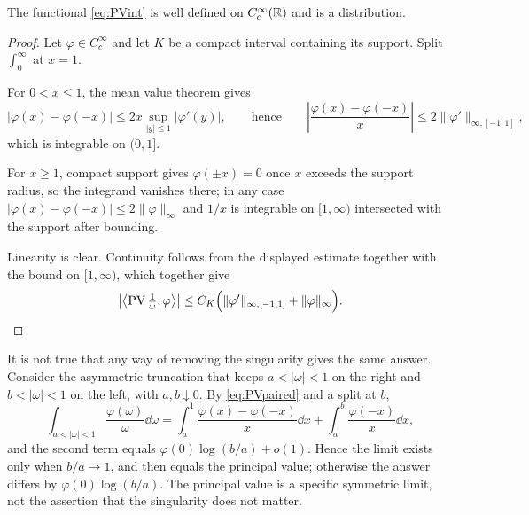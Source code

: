 \begin{theorem}[existence]\label{thm:PVexists}
The functional \eqref{eq:PVint} is well defined on $C_{c}^{\infty}(\mathbb{R})$ and is a distribution.
\end{theorem}

\begin{proof}
Let $\varphi\in C_{c}^{\infty}$ and let $K$ be a compact interval containing its support. Split
$\int_{0}^{\infty}$ at $x=1$.

For $0<x\le1$, the mean value theorem gives
\begin{equation}
|\varphi(x)-\varphi(-x)|\le 2x\sup_{|y|\le1}|\varphi'(y)| ,
\qquad\text{hence}\qquad
\left|\frac{\varphi(x)-\varphi(-x)}{x}\right|\le 2\|\varphi'\|_{\infty,[-1,1]} ,
\end{equation}
which is integrable on $(0,1]$.

For $x\ge1$, compact support gives $\varphi(\pm x)=0$ once $x$ exceeds the support radius, so the
integrand vanishes there; in any case $|\varphi(x)-\varphi(-x)|\le 2\|\varphi\|_{\infty}$ and
$1/x$ is integrable on $[1,\infty)$ intersected with the support after bounding.

Linearity is clear. Continuity follows from the displayed estimate together with the bound on
$[1,\infty)$, which together give
\begin{equation}
\left|\left\langle\operatorname{PV}\tfrac{1}{\omega},\varphi\right\rangle\right|
\le C_{K}\Big(\|\varphi'\|_{\infty,[-1,1]}+\|\varphi\|_{\infty}\Big). \qedhere
\end{equation}
\end{proof}

\begin{remark}\label{rem:PVasym}
It is not true that any way of removing the singularity gives the same answer. Consider the
asymmetric truncation that keeps $a<|\omega|<1$ on the right and $b<|\omega|<1$ on the left, with
$a,b\downarrow0$. By \eqref{eq:PVpaired} and a split at $b$,
\begin{equation}
\int_{a<|\omega|<1}\frac{\varphi(\omega)}{\omega}\dd\omega
=\int_{a}^{1}\frac{\varphi(x)-\varphi(-x)}{x}\dd x+\int_{a}^{b}\frac{\varphi(-x)}{x}\dd x ,
\end{equation}
and the second term equals $\varphi(0)\log(b/a)+o(1)$. Hence the limit exists only when
$b/a\to1$, and then equals the principal value; otherwise the answer differs by
$\varphi(0)\log(b/a)$. The principal value is a specific symmetric limit, not the assertion that
the singularity does not matter.
\end{remark}

